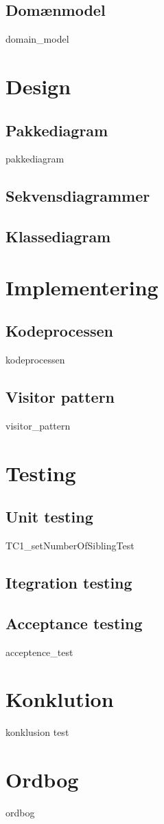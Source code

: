 \documentclass{article}
\begin{document}
{\subsection{Domænmodel}
{domain_model}
\newpage

\section{Design}

\subsection{Pakkediagram}
{pakkediagram}
\newpage
\subsection{Sekvensdiagrammer}
\subsection{Klassediagram}

\section{Implementering}
\subsection{Kodeprocessen}
{kodeprocessen}
\subsection{Visitor pattern}
{visitor_pattern}
\section{Testing}
\subsection{Unit testing}
{TC1_setNumberOfSiblingTest}
\subsection{Itegration testing}

\subsection{Acceptance testing}
{acceptence_test}

\section{Konklution}
{konklusion}
test

\newpage
\section*{Ordbog}

{ordbog}




\newpage
\cleardoublepage
\printbibliography[heading=bibintoc]
}
\end{document}
